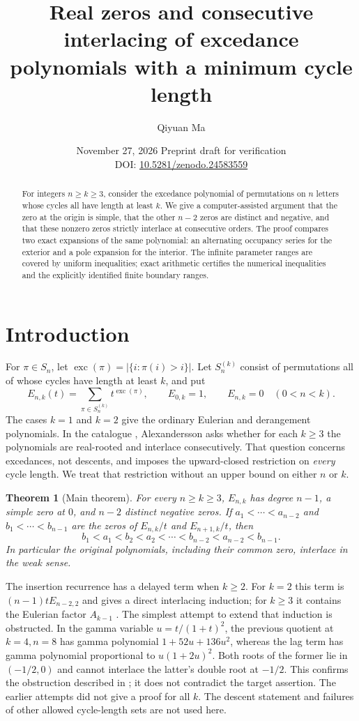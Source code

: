 \documentclass[11pt,reqno]{amsart}
\title[Interlacing with a minimum cycle length]{Real zeros and consecutive interlacing of excedance polynomials with a minimum cycle length}
\author[Q. Ma]{Qiyuan Ma}
\author@andify\authors
\date{November 27, 2026 \quad\textnormal{Preprint draft for verification}\\[4pt]\textnormal{DOI: \href{https://doi.org/10.5281/zenodo.24583559}{10.5281/zenodo.24583559}}}
\newtheorem{theorem}{Theorem}[section]
\theoremstyle{remark}
\newcommand{\exc}{\operatorname{exc}}
\begin{document}
\begin{abstract}
For integers $n\ge k\ge3$, consider the excedance polynomial of permutations on $n$ letters whose cycles all have length at least $k$. We give a computer-assisted argument that the zero at the origin is simple, that the other $n-2$ zeros are distinct and negative, and that these nonzero zeros strictly interlace at consecutive orders. The proof compares two exact expansions of the same polynomial: an alternating occupancy series for the exterior and a pole expansion for the interior. The infinite parameter ranges are covered by uniform inequalities; exact arithmetic certifies the numerical inequalities and the explicitly identified finite boundary ranges.
\end{abstract}
\maketitle

\section{Introduction}
For $\pi\in S_n$, let $\exc(\pi)=|\{i:\pi(i)>i\}|$. Let $S_n^{(k)}$ consist of permutations all of whose cycles have length at least $k$, and put
\[
 E_{n,k}(t)=\sum_{\pi\in S_n^{(k)}}t^{\exc(\pi)},\qquad E_{0,k}=1,\qquad E_{n,k}=0\quad(0<n<k).
\]
The cases $k=1$ and $k=2$ give the ordinary Eulerian and derangement polynomials. In the catalogue \cite{SymCat}, Alexandersson asks whether for each $k\ge3$ the polynomials are real-rooted and interlace consecutively. That question concerns excedances, not descents, and imposes the upward-closed restriction on \emph{every} cycle length. We treat that restriction without an upper bound on either $n$ or $k$.

\begin{theorem}[Main theorem]\label{thm:main}
For every $n\ge k\ge3$, $E_{n,k}$ has degree $n-1$, a simple zero at $0$, and $n-2$ distinct negative zeros. If $a_1<\cdots<a_{n-2}$ and $b_1<\cdots<b_{n-1}$ are the zeros of $E_{n,k}/t$ and $E_{n+1,k}/t$, then
\[
 b_1<a_1<b_2<a_2<\cdots<b_{n-2}<a_{n-2}<b_{n-1}.
\]
In particular the original polynomials, including their common zero, interlace in the weak sense.
\end{theorem}

The insertion recurrence has a delayed term when $k\ge2$. For $k=2$ this term is $(n-1)tE_{n-2,2}$ and gives a direct interlacing induction; for $k\ge3$ it contains the Eulerian factor $A_{k-1}$ \cite{SymCat}. The simplest attempt to extend that induction is obstructed. In the gamma variable $u=t/(1+t)^2$, the previous quotient at $k=4,n=8$ has gamma polynomial $1+52u+136u^2$, whereas the lag term has gamma polynomial proportional to $u(1+2u)^2$. Both roots of the former lie in $(-1/2,0)$ and cannot interlace the latter's double root at $-1/2$. This confirms the obstruction described in \cite{Davis81}; it does not contradict the target assertion. The earlier attempts \cite{Davis55,Davis81,DavisNotes} did not give a proof for all $k$. The descent statement and failures of other allowed cycle-length sets are not used here.
\end{document}
